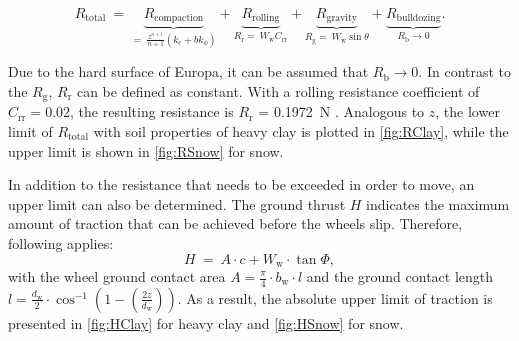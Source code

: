 \begin{equation}
 	R_{\text{total}} \:  = \: 
 	\underbrace{R_\text{compaction}}_{= \: \frac{z^{n+1}}{n+1} \left( k_\text{c} + b  k_\phi \right)} + 
 	\underbrace{R_\text{rolling}}_{R_\text{r} = \: W_\text{w}  C_\text{rr}} +  
 	\underbrace{R_\text{gravity}}_{R_\text{g} = \: W_\text{w}  \sin \theta} +
 	\underbrace{R_\text{bulldozing}}_{R_\text{b} \rightarrow 0}. 	
 	\label{eq:Resistance}
 \end{equation} 

Due to the hard surface of Europa, it can be assumed that \( R_\text{b} \rightarrow 0\). In contrast to the \( R_\text{g} \), \( R_\text{r}\) can be defined as constant. With a rolling resistance coefficient of \( C_\text{rr} = 0.02\), the resulting resistance is \( R_\text{r}\) = 0.1972~N \cite{rolling coefficient}. Analogous to \(z\), the lower limit of \(R_{\text{total}}\) with soil properties of heavy clay is plotted in \autoref{fig:RClay}, while the upper limit is shown in \autoref{fig:RSnow} for snow.

In addition to the resistance that needs to be exceeded in order to move, an upper limit can also be determined. The ground thrust \(H\) indicates the maximum amount of traction that can be achieved before the wheels slip.  Therefore, following applies:
\begin{equation}
	H \:  = \: A \cdot c + W_\text{w} \cdot \tan \Phi , 
	\label{eq:}
\end{equation}
 with the wheel ground contact area \(A = \frac{\pi}{4} \cdot b_\text{w} \cdot l\) and the ground contact length \(l = \frac{d_\text{w}}{2} \cdot \cos^{-1} \left( 1 - \left( \frac{2z}{d_\text{w}} \right) \right)  \). As a result, the absolute upper limit of traction is presented in \autoref{fig:HClay} for heavy clay and \autoref{fig:HSnow} for snow. 
 

